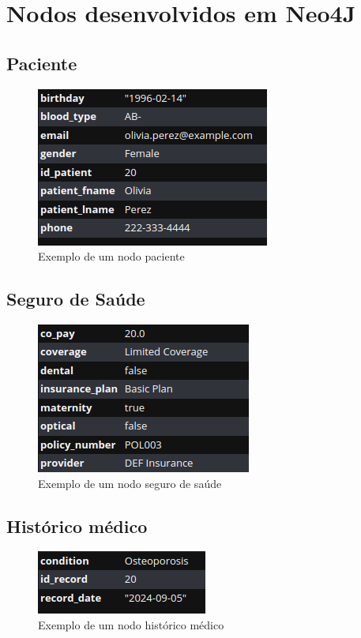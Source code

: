 \appendix

\chapter{Nodos desenvolvidos em Neo4J}


\section{Paciente}\label{secPaciente}
\begin{figure}[H]
    \centering
    \includegraphics[width=0.3\linewidth]{Imagens/Neo4j/patient.png}
    \caption{Exemplo de um nodo paciente}
    \label{fig:nodo_paciente}
\end{figure}

\section{Seguro de Saúde}\label{secSeguroSaude}
\begin{figure}[H]
    \centering
    \includegraphics[width=0.3\linewidth]{Imagens/Neo4j/insurance.png}
    \caption{Exemplo de um nodo seguro de saúde}
    \label{fig:nodo_seguro_saude}
\end{figure}

\section{Histórico médico}\label{secHistoricoMedico}
\begin{figure}[H]
    \centering
    \includegraphics[width=0.3\linewidth]{Imagens/Neo4j/medical_history.png}
    \caption{Exemplo de um nodo histórico médico}
    \label{fig:nodo_historico_medico}
\end{figure}

